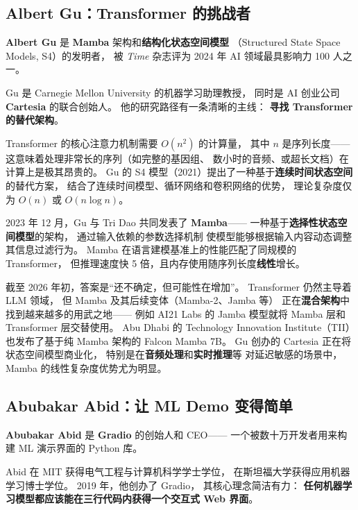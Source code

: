 \subsection{Albert Gu：Transformer 的挑战者}
\label{subsec:albert-gu}

\textbf{Albert Gu} 是 \textbf{Mamba} 架构和\textbf{结构化状态空间模型}
（Structured State Space Models, S4）的发明者，
被 \textit{Time} 杂志评为 2024 年 AI 领域最具影响力 100 人之一。

Gu 是 Carnegie Mellon University 的机器学习助理教授，
同时是 AI 创业公司 \textbf{Cartesia} 的联合创始人。
他的研究路径有一条清晰的主线：
\textbf{寻找 Transformer 的替代架构}。

Transformer 的核心注意力机制需要 $O(n^2)$ 的计算量，
其中 $n$ 是序列长度——这意味着处理非常长的序列（如完整的基因组、
数小时的音频、或超长文档）在计算上是极其昂贵的。
Gu 的 S4 模型（2021）提出了一种基于\textbf{连续时间状态空间}的替代方案，
结合了连续时间模型、循环网络和卷积网络的优势，
理论复杂度仅为 $O(n)$ 或 $O(n \log n)$。

2023 年 12 月，Gu 与 Tri Dao 共同发表了 \textbf{Mamba}——
一种基于\textbf{选择性状态空间模型}的架构，
通过输入依赖的参数选择机制
使模型能够根据输入内容动态调整其信息过滤行为。
Mamba 在语言建模基准上的性能匹配了同规模的 Transformer，
但推理速度快 5 倍，且内存使用随序列长度\textbf{线性}增长。

\begin{whybox}
截至 2026 年初，答案是``还不确定，但可能性在增加''。
Transformer 仍然主导着 LLM 领域，
但 Mamba 及其后续变体（Mamba-2、Jamba 等）
正在\textbf{混合架构}中找到越来越多的用武之地——
例如 AI21 Labs 的 Jamba 模型就将 Mamba 层和 Transformer 层交替使用。
Abu Dhabi 的 Technology Innovation Institute（TII）
也发布了基于纯 Mamba 架构的 Falcon Mamba 7B。
Gu 创办的 Cartesia 正在将状态空间模型商业化，
特别是在\textbf{音频处理}和\textbf{实时推理}等
对延迟敏感的场景中，
Mamba 的线性复杂度优势尤为明显。
\end{whybox}


\subsection{Abubakar Abid：让 ML Demo 变得简单}
\label{subsec:abid}

\textbf{Abubakar Abid} 是 \textbf{Gradio} 的创始人和 CEO——
一个被数十万开发者用来构建 ML 演示界面的 Python 库。

Abid 在 MIT 获得电气工程与计算机科学学士学位，
在斯坦福大学获得应用机器学习博士学位。
2019 年，他创办了 Gradio，
其核心理念简洁有力：
\textbf{任何机器学习模型都应该能在三行代码内获得一个交互式 Web 界面}。

